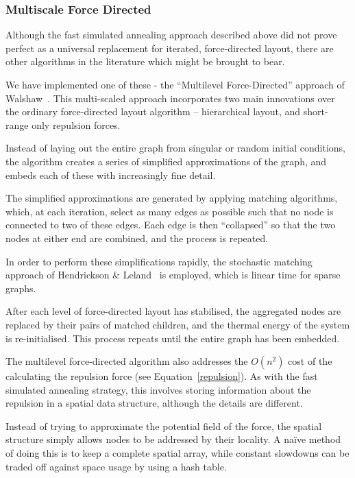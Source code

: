 \documentclass[runningheads]{cl2emult}
\begin{document}
\subsubsection{Multiscale Force Directed}

Although the fast simulated annealing approach described above did not prove
perfect as a universal replacement for iterated, force-directed layout, there
are other algorithms in the literature which might be brought to bear.

We have implemented one of these - the ``Multilevel Force-Directed'' approach
of Walshaw~\cite{walshaw00multilevel}.  This multi-scaled approach
incorporates two main innovations over the ordinary force-directed layout
algorithm -- hierarchical layout, and short-range only repulsion forces.

Instead of laying out the entire graph from singular or random initial
conditions, the algorithm creates a series of simplified approximations of
the graph, and embeds each of these with increasingly fine detail.

The simplified approximations are generated by applying matching algorithms,
which, at each iteration, select as many edges as possible such that
no node is connected to two of these edges.  Each edge is then ``collapsed''
so that the two nodes at either end are combined, and the process is repeated.

In order to perform these simplifications rapidly, the stochastic matching
approach of Hendrickson \& Leland~\cite{hendrickson95multilevel} is employed,
which is linear time for sparse graphs.

After each level of force-directed layout has stabilised, the aggregated
nodes are replaced by their pairs of matched children, and the thermal energy
of the system is re-initialised.  This process repeats until the entire graph
has been embedded.

The multilevel force-directed algorithm also addresses the $O(n^2)$ cost of
the calculating the repulsion force (see Equation~\ref{repulsion}).  As with
the fast simulated annealing strategy, this involves storing information about
the repulsion in a spatial data structure, although the details are different.

Instead of trying to approximate the potential field of the force, the
spatial structure simply allows nodes to be addressed by their locality.  A
na\"{i}ve method of doing this is to keep a complete spatial array, while
constant slowdowns can be traded off against space usage by using a hash
table.
\end{document}
